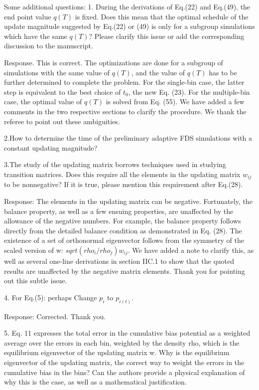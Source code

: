 \documentclass[preprint, superscriptaddress, floatfix]{revtex4-1}
\begin{document}
Some additional questions:
1. During the derivations of Eq.(22) and Eq.(49), the end point value $q(T)$ is fixed. Does
this mean that the optimal schedule of the update magnitude suggested by Eq.(22) or (49)
is only for a subgroup simulations which have the same $q(T)$? Please clarify this issue or
add the corresponding discussion to the manuscript.

Response.  This is correct. The optimizations are done for a subgroup of simulations with the same value of $q(T)$, and the value of $q(T)$ has to be further determined to complete the problem.
For the single-bin case, the latter step is equivalent to the best choice of $t_0$, the new Eq. (23).
For the multiple-bin case, the optimal value of $q(T)$ is solved from Eq. (55).
We have added a few comments in the two respective sections to clarify the procedure.
We thank the referee to point out these ambiguities.


2.How to determine the time of the preliminary adaptive FDS simulations with a constant
updating magnitude?



3.The study of the updating matrix borrows techniques used in studying transition matrices.
Does this require all the elements in the updating matrix $w_{ij}$ to be nonnegative? If it is
true, please mention this requirement after Eq.(28).

Response: The elements in the updating matrix can be negative.
Fortunately, the balance property, as well as a few ensuing properties, are unaffected by the allowance of the negative numbers.
For example, the balance property follows directly from
the detailed balance condition as demonstrated in Eq. (28).
The existence of a set of orthonormal eigenvector follows from
the symmetry of the scaled version of w:
$sqrt(rho_i/rho_j) w_{ij}$.
We have added a note to clarify this, as well as several one-line derivations in section IIC.1 to show that the quoted results are unaffected by the negative matrix elements.
Thank you for pointing out this subtle issue.


4. For Eq.(5): perhaps Change $p_i$ to $p_{i(t)}$.

Response: Corrected.  Thank you.

5. Eq. 11 expresses the total error in the cumulative bias potential as a weighted average
over the errors in each bin, weighted by the density rho, which is the equilibrium
eigenvector of the updating matrix w. Why is the equilibrium eigenvector of the
updating matrix, the correct way to weight the errors in the cumulative bias in the bins?
Can the authors provide a physical explanation of why this is the case, as well as a
mathematical justification.
\end{document}
